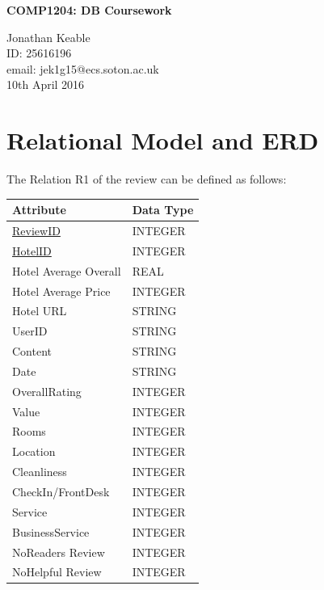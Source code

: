 \documentclass[11pt,epsfig]{article}
\begin{document}

\centerline{\Large \bf COMP1204: DB Coursework}        
\vfill 
   
Jonathan Keable \\                             %
ID: 25616196\\				%
email: jek1g15@ecs.soton.ac.uk \\ %
10th April 2016 \hfill                             %


\section{Relational Model and ERD}
The Relation R1 of the review can be defined as follows:

\begin{table}[!htbp]
\centering
\begin{tabular}{|l|l|}
\hline
\textbf{Attribute} & \textbf{Data Type} \\ \hline
\underline{ReviewID} & INTEGER \\ \hline
\underline{HotelID} & INTEGER \\ \hline
Hotel Average Overall & REAL \\ \hline
Hotel Average Price & INTEGER \\ \hline
Hotel URL & STRING \\ \hline
UserID & STRING \\ \hline
Content & STRING \\ \hline
Date & STRING \\ \hline
OverallRating & INTEGER \\ \hline
Value & INTEGER \\ \hline
Rooms & INTEGER \\ \hline
Location & INTEGER \\ \hline
Cleanliness & INTEGER \\ \hline
CheckIn/FrontDesk & INTEGER \\ \hline
Service & INTEGER \\ \hline
BusinessService & INTEGER \\ \hline
NoReaders Review & INTEGER \\ \hline
NoHelpful Review & INTEGER \\ \hline
\end{tabular}
\end{table}
\end{document}
